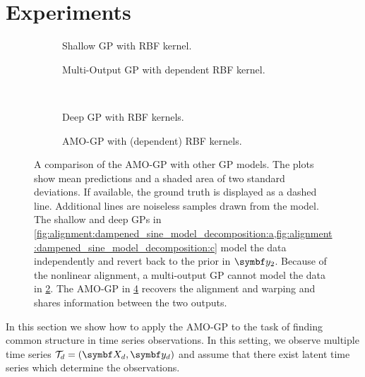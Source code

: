 \section{Experiments}
\label{toc:alignment:experiments}
\begin{figure}[tp]
    \centering
    \begin{subfigure}{\halffigurewidth}
        \centering
        \caption{
            Shallow GP with RBF kernel.
            \label{fig:alignment:dampened_sine_model_decomposition:a}
        }
    \end{subfigure}
    \hfill
    \begin{subfigure}{\halffigurewidth}
        \centering
        \caption{
            Multi-Output GP with dependent RBF kernel.
            \label{fig:alignment:dampened_sine_model_decomposition:b}
        }
    \end{subfigure}
    \\[.25\figureskip]
    \begin{subfigure}{\halffigurewidth}
        \centering
        \caption{
            Deep GP with RBF kernels.
            \label{fig:alignment:dampened_sine_model_decomposition:c}
        }
    \end{subfigure}
    \hfill
    \begin{subfigure}{\halffigurewidth}
        \centering
        \caption{
            AMO-GP with (dependent) RBF kernels.
            \label{fig:alignment:dampened_sine_model_decomposition:d}
        }
    \end{subfigure}
    \caption{
        \label{fig:alignment:dampened_sine_model_decomposition}
        A comparison of the AMO-GP with other GP models.
        The plots show mean predictions and a shaded area of two standard deviations.
        If available, the ground truth is displayed as a dashed line.
        Additional lines are noiseless samples drawn from the model.
        The shallow and deep GPs in \cref{fig:alignment:dampened_sine_model_decomposition:a,fig:alignment:dampened_sine_model_decomposition:c} model the data independently and revert back to the prior in $\rv{y}_2$.
        Because of the nonlinear alignment, a multi-output GP cannot model the data in \cref{fig:alignment:dampened_sine_model_decomposition:b}.
        The AMO-GP in \cref{fig:alignment:dampened_sine_model_decomposition:d} recovers the alignment and warping and shares information between the two outputs.
    }
\end{figure}
In this section we show how to apply the AMO-GP to the task of finding common structure in time series observations.
In this setting, we observe multiple time series $\Tc_d = (\mat{X}_d, \mat{y}_d)$ and assume that there exist latent time series which determine the observations.

